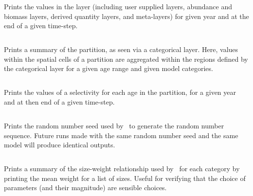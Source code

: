Prints the values in the layer (including user supplied layers, abundance and biomass layers, derived quantity layers, and meta-layers) for given year and at the end of a given time-step. 

\subsection{}

Prints a summary of the partition, as seen via a categorical layer. Here, values within the spatial cells of a partition are aggregated within the regions defined by the categorical layer for a given age range and given model categories.

\subsection{}

Prints the values of a selectivity for each age in the partition, for a given year and at then end of a given time-step.

\subsection{}

Prints the random number seed used by \SPM\ to generate the random number sequence. Future runs made with the same random number seed and the same model will produce identical outputs.

\subsection{\label{sec:report-size-weight}}

Prints a summary of the size-weight relationship used by \SPM\ for each category by printing the mean weight for a list of sizes. Useful for verifying that the choice of parameters (and their magnitude) are sensible choices.

\subsection{\label{sec:report-age-size}}


